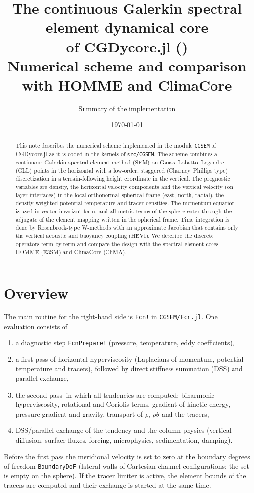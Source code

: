 \documentclass[11pt,a4paper]{article}
\title{The continuous Galerkin spectral element dynamical core\\
of CGDycore.jl (\code{src/CGSEM})\\[0.3em]
\large Numerical scheme and comparison with HOMME and ClimaCore}
\author{Summary of the implementation}
\date{\today}
\newcommand{\code}[1]{\texttt{#1}}
\begin{document}
\maketitle

\begin{abstract}
This note describes the numerical scheme implemented in the module
\code{CGSEM} of CGDycore.jl as it is coded in the kernels of
\code{src/CGSEM}. The scheme combines a continuous Galerkin spectral element
method (SEM) on Gauss--Lobatto--Legendre (GLL) points in the horizontal with
a low-order, staggered (Charney--Phillips type) discretization in a
terrain-following height coordinate in the vertical. The prognostic variables
are density, the horizontal velocity components and the vertical velocity
(on layer interfaces) in the local orthonormal spherical frame
(east, north, radial), the density-weighted potential temperature and tracer
densities. The momentum equation is used in vector-invariant form, and all
metric terms of the sphere enter through the adjugate of the element mapping
written in the spherical frame. Time integration is done by Rosenbrock-type W-methods with an
approximate Jacobian that contains only the vertical acoustic and buoyancy
coupling (HEVI). We describe the discrete operators term by term and compare
the design with the spectral element cores HOMME (E3SM) and ClimaCore
(CliMA).
\end{abstract}

\tableofcontents

\section{Overview}

The main routine for the right-hand side is \code{Fcn!} in
\code{CGSEM/Fcn.jl}. One evaluation consists of
\begin{enumerate}
\item a diagnostic step \code{FcnPrepare!} (pressure, temperature, eddy
  coefficients),
\item a first pass of horizontal hyperviscosity (Laplacians of momentum,
  potential temperature and tracers), followed by direct stiffness summation
  (DSS) and parallel exchange,
\item the second pass, in which all tendencies are computed: biharmonic
  hyperviscosity, rotational and Coriolis terms, gradient of kinetic energy,
  pressure gradient and gravity, transport of $\rho$, $\rho\theta$ and the
  tracers,
\item DSS/parallel exchange of the tendency and the column physics (vertical
  diffusion, surface fluxes, forcing, microphysics, sedimentation, damping).
\end{enumerate}
Before the first pass the meridional velocity is set to zero at the
boundary degrees of freedom \code{BoundaryDoF} (lateral walls of Cartesian
channel configurations; the set is empty on the sphere). If the tracer
limiter is active, the element bounds of the tracers are computed and their
exchange is started at the same time.
\end{document}
